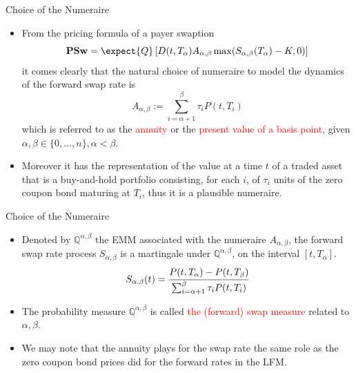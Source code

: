 \documentclass{beamer}
\begin{document}
\begin{frame}{Choice of the Numeraire}
	\begin{itemize}
		\item<1-> From the pricing formula of a payer swaption
		\begin{equation*}
			\textbf{PSw}=\expect{Q}\left[D(t,T_\alpha)A_{\alpha,\beta}\max(S_{\alpha,\beta}(T_\alpha)-K, 0)\right]
		\end{equation*}
		it comes clearly that the natural choice of numeraire to model the dynamics of the forward swap rate is
		\begin{equation*}
			A_{\alpha,\beta} := \sum^\beta_{i=\alpha+1}\tau_i P(t, T_i)
		\end{equation*}
		which is referred to as the \textcolor{red}{annuity} or the \textcolor{red}{present value of a basis point}, given $\alpha, \beta \in \{0,\ldots, n\}, \alpha < \beta$. 
	  \item<2-> Moreover it has the representation of the value at a time $t$ of a traded asset that is a buy-and-hold portfolio consisting, for each $i$, of $\tau_i$ units of the zero coupon bond maturing at $T_i$, thus it is a plausible numeraire.
	\end{itemize}
\end{frame}

\begin{frame}{Choice of the Numeraire}
  \begin{itemize}
  \item<1-> Denoted by $\mathbb{Q}^{\alpha,\beta}$ the EMM associated with the numeraire $A_{\alpha,\beta}$, the forward swap rate process $S_{\alpha,\beta}$ is a martingale under $\mathbb{Q}^{\alpha,\beta}$, on the interval $[t, T_\alpha]$.
  \begin{equation*}
  	S_{\alpha,\beta}(t) = \cfrac{P(t,T_\alpha)-P(t,T_\beta)}{\sum_{i=\alpha+1}^{\beta}\tau_iP(t,T_i)}
  \end{equation*}
  \item<2-> The probability measure $\mathbb{Q}^{\alpha,\beta}$ is called \textcolor{red}{the (forward) swap measure} related to $\alpha, \beta$.
  \item<2-> We may note that the annuity plays for the swap rate the same role as the zero coupon bond prices did for the forward rates in the LFM. 
  \end{itemize}
\end{frame}
\end{document}
